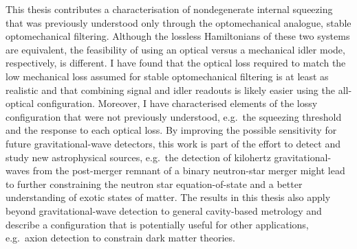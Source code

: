 This thesis contributes a characterisation of nondegenerate internal squeezing that was previously understood only through the optomechanical analogue, stable optomechanical filtering. Although the lossless Hamiltonians of these two systems are equivalent, the feasibility of using an optical versus a mechanical idler mode, respectively, is different. I have found that the optical loss required to match the low mechanical loss assumed for stable optomechanical filtering is at least as realistic and that combining signal and idler readouts is likely easier using the all-optical configuration. Moreover, I have characterised elements of the lossy configuration that were not previously understood, e.g.\ the squeezing threshold and the response to each optical loss.
By improving the possible sensitivity for future gravitational-wave detectors, this work is part of the effort to detect and study new astrophysical sources, e.g.\ the detection of kilohertz gravitational-waves from the post-merger remnant of a binary neutron-star merger might lead to further constraining the neutron star equation-of-state and a better understanding of exotic states of matter.
The results in this thesis also apply beyond gravitational-wave detection to general cavity-based metrology and describe a configuration that is potentially useful for other applications, e.g.\ axion detection to constrain dark matter theories.



